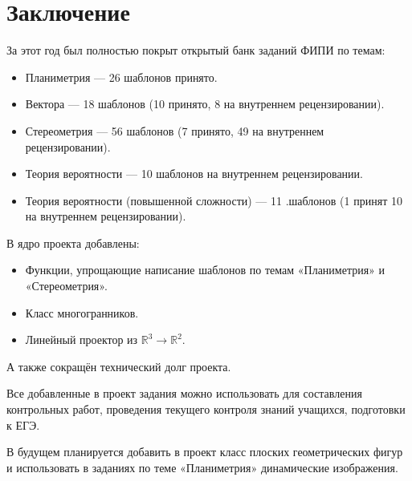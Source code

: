\section*{Заключение}
За этот год был полностью покрыт открытый банк заданий ФИПИ по темам:
		      \begin{itemize}
			      \item Планиметрия — 26 шаблонов принято.
			      \item Вектора — 18 шаблонов (10 принято, 8 на внутреннем рецензировании).
			      \item Стереометрия — 56 шаблонов (7 принято, 49 на внутреннем рецензировании).
			      \item Теория вероятности — 10 шаблонов на внутреннем рецензировании.
			      \item Теория вероятности (повышенной сложности) — 11 .шаблонов (1 принят 10 на внутреннем рецензировании).
		      \end{itemize}

В ядро проекта добавлены: 
\begin{itemize}
    \item Функции, упрощающие написание шаблонов по темам «Планиметрия» и  «Стереометрия».
    \item Класс многогранников.
    \item Линейный проектор из $\mathbb{R}^3 \to \mathbb{R}^2$.
\end{itemize}

А также сокращён технический долг проекта.

Все добавленные в проект задания можно использовать для составления контрольных работ, проведения текущего контроля знаний учащихся, подготовки к ЕГЭ. %

В будущем планируется добавить в проект класс плоских геометрических фигур и использовать в заданиях по теме «Планиметрия» динамические изображения.


